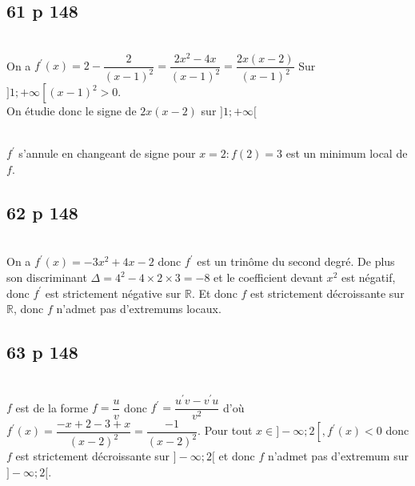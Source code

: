 \documentclass[12pt,a4paper]{book}
\begin{document}
\subsection*{61 p 148}
\grasInMet{$f(x)=2 x-3+\frac{2}{x-1}$ sur $] 1 ;+\infty[$}\\
On a $f^{\prime}(x)=2-\dfrac{2}{(x-1)^{2}}=\dfrac{2 x^{2}-4 x}{(x-1)^{2}}=\dfrac{2 x(x-2)}{(x-1)^{2}}$
Sur $] 1 ;+\infty\left[(x-1)^{2}>0\right.$. \\
On étudie donc le signe de $2 x(x-2)$ sur $] 1 ;+\infty[$\\
    \\
    $f^{\prime}$ s'annule en changeant de signe pour $x=2: f(2)=3$ est un minimum local de $f$.


\subsection*{62 p 148}
\\
On a $f^{\prime}(x)=-3 x^{2}+4 x-2$ donc $f^{\prime}$ est un trinôme du second degré. De plus son discriminant $\Delta=4^{2}-4 \times 2 \times 3=-8$ et le coefficient devant $x^{2}$ est négatif, donc $f^{\prime}$ est strictement négative sur $\mathbb{R}$. Et donc $f$ est strictement décroissante sur $\mathbb{R}$, donc $f$ n'admet pas d'extremums locaux.

\subsection*{63 p 148}
\grasInMet{$f(x)=\dfrac{3-x}{x-2} \text { sur }]-\infty ; 2[$}\\
$f$ est de la forme $f=\dfrac{u}{v}$ donc $f^{\prime}=\dfrac{u^{\prime} v-v^{\prime} u}{v^{2}}$ d'où $f^{\prime}(x)=\dfrac{-x+2-3+x}{(x-2)^{2}}=\dfrac{-1}{(x-2)^{2}}$.
Pour tout $x \in]-\infty ; 2\left[, f^{\prime}(x)<0\right.$ donc $f$ est strictement décroissante sur $]-\infty ; 2[$ et donc $f$ n'admet pas d'extremum sur $]-\infty ; 2[$.
\end{document}
